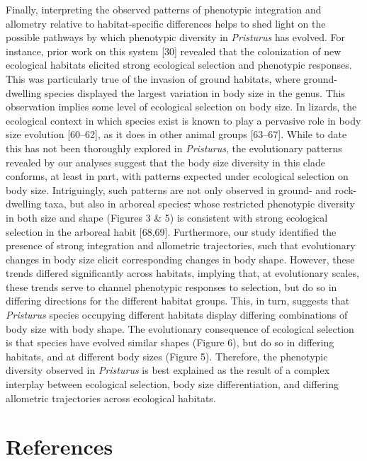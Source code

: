 \documentclass[
  11pt,
]{article}
\providecommand{\DIFaddtex}[1]{{\protect\color{blue}\uwave{#1}}} %
\providecommand{\DIFdeltex}[1]{{\protect\color{red}\sout{#1}}}                      %
\providecommand{\DIFaddbegin}{} %
\providecommand{\DIFaddend}{} %
\providecommand{\DIFdelbegin}{} %
\providecommand{\DIFdelend}{} %
\providecommand{\DIFadd}[1]{\texorpdfstring{\DIFaddtex{#1}}{#1}} %
\providecommand{\DIFdel}[1]{\texorpdfstring{\DIFdeltex{#1}}{}} %
\newcommand{\DIFscaledelfig}{0.5}
\newlength{\DIFdelgraphicswidth} %
\newlength{\DIFdelgraphicsheight} %
\newcommand{\DIFaddincludegraphics}[2][]{{\color{blue}\fbox{\DIFOincludegraphics[#1]{#2}}}} %
\newcommand{\DIFdelincludegraphics}[2][]{%
\sbox{\DIFdelgraphicsbox}{\DIFOincludegraphics[#1]{#2}}%
\settoboxwidth{\DIFdelgraphicswidth}{\DIFdelgraphicsbox} %
\settoboxtotalheight{\DIFdelgraphicsheight}{\DIFdelgraphicsbox} %
\scalebox{\DIFscaledelfig}{%
\parbox[b]{\DIFdelgraphicswidth}{\usebox{\DIFdelgraphicsbox}\\[-\baselineskip] \rule{\DIFdelgraphicswidth}{0em}}\llap{\resizebox{\DIFdelgraphicswidth}{\DIFdelgraphicsheight}{%
\setlength{\unitlength}{\DIFdelgraphicswidth}%
\begin{picture}(1,1)%
\thicklines\linethickness{2pt} %
{\color[rgb]{1,0,0}\put(0,0){\framebox(1,1){}}}%
{\color[rgb]{1,0,0}\put(0,0){\line( 1,1){1}}}%
{\color[rgb]{1,0,0}\put(0,1){\line(1,-1){1}}}%
\end{picture}%
}\hspace*{3pt}}} %
} %
\DeclareRobustCommand{\DIFaddbegin}{\DIFOaddbegin \let\includegraphics\DIFaddincludegraphics} %
\DeclareRobustCommand{\DIFaddend}{\DIFOaddend \let\includegraphics\DIFOincludegraphics} %
\DeclareRobustCommand{\DIFdelbegin}{\DIFOdelbegin \let\includegraphics\DIFdelincludegraphics} %
\DeclareRobustCommand{\DIFdelend}{\DIFOaddend \let\includegraphics\DIFOincludegraphics} %
\begin{document}
Finally, interpreting the observed patterns of phenotypic integration
and allometry relative to habitat-specific differences helps to shed
light on the possible pathways by which phenotypic diversity in
\emph{Pristurus} has evolved. For instance, prior work on this system
{[}30{]} revealed that the colonization of new ecological habitats
elicited strong ecological selection and phenotypic responses. This was
particularly true of the invasion of ground habitats, where
ground-dwelling species displayed the largest variation in body size in
the genus. This observation implies some level of ecological selection
on body size. In lizards, the ecological context in which species exist
is known to play a pervasive role in body size evolution {[}60--62{]},
as it does in other animal groups {[}63--67{]}. While to date this has
not been thoroughly explored in \emph{Pristurus}, the evolutionary
patterns revealed by our analyses suggest that the body size diversity
in this clade conforms, at least in part, with patterns expected under
ecological selection on body size. Intriguingly, such patterns are not
only observed in ground- and rock-dwelling taxa, but also in arboreal
species\DIFdelbegin \DIFdel{; }\DIFdelend \DIFaddbegin \DIFadd{, }\DIFaddend whose restricted phenotypic diversity in both size and shape
(Figures 3 \& 5) is consistent with strong ecological selection in the
arboreal habit {[}68,69{]}. Furthermore, our study identified the
presence of strong integration and allometric trajectories, such that
evolutionary changes in body size elicit corresponding changes in body
shape. However, these trends differed significantly across habitats,
implying that, at evolutionary scales, these trends serve to channel
phenotypic responses to selection, but do so in differing directions for
the different habitat groups. This, in turn, suggests that
\emph{Pristurus} species occupying different habitats display differing
combinations of body size with body shape. The evolutionary consequence
of ecological selection is that species have evolved similar shapes
(Figure 6), but do so in differing habitats, and at different body sizes
(Figure 5). Therefore, the phenotypic diversity observed in
\emph{Pristurus} is best explained as the result of a complex interplay
between ecological selection, body size differentiation, and differing
allometric trajectories across ecological habitats.

\newpage

\hypertarget{references}{%
\section*{References}\label{references}}
\end{document}
